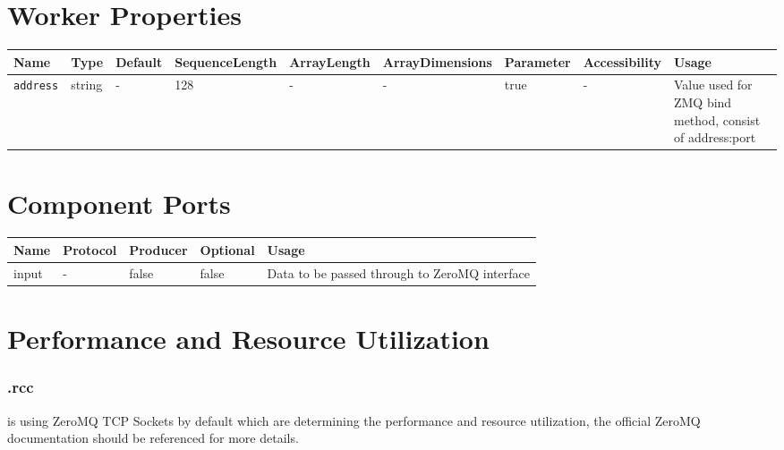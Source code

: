 \begin{landscape}
\section*{Worker Properties}

\begin{flushleft}
        \begin{scriptsize}
        \begin{tabular}{|p{2.5cm}|p{1cm}|p{1.5cm}|p{2cm}|p{2cm}|p{2.5cm}|p{1.5cm}|p{1.5cm}|p{5.5cm}|}
                \hline
                \rowcolor{blue}
                Name & Type & Default & SequenceLength & ArrayLength & ArrayDimensions & Parameter  & Accessibility & Usage \\
                \hline
                \verb+address+ & string & - & 128 & - & - & true & - & Value used for ZMQ bind method, consist of address:port\\
        \end{tabular}
        \end{scriptsize}
\end{flushleft}


\section*{Component Ports}

        \begin{scriptsize}
                \begin{tabular}{|M{2.5cm}|M{2cm}|M{2cm}|M{2.5cm}|M{12.5cm}|}
                        \hline
                        Name & Protocol & Producer & Optional & Usage\\
                        \hline
                        input
                        & -
                        & false
                        & false
                        & Data to be passed through to ZeroMQ interface \\
                        \hline
                \end{tabular}
			\end{scriptsize}
\end{landscape}


\section*{Performance and Resource Utilization}
    \subsubsection*{\comp.rcc}
        {\comp} is using ZeroMQ TCP Sockets by default which are determining the performance and resource utilization, the official ZeroMQ documentation should be referenced for more details. 


